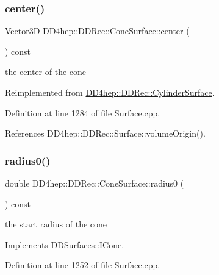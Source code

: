 \subsubsection{\texorpdfstring{center()}{center()}}
{\footnotesize\ttfamily \hyperlink{class_d_d_surfaces_1_1_vector3_d}{Vector3D} D\+D4hep\+::\+D\+D\+Rec\+::\+Cone\+Surface\+::center (\begin{DoxyParamCaption}{ }\end{DoxyParamCaption}) const\hspace{0.3cm}{\ttfamily [virtual]}}



the center of the cone 



Reimplemented from \hyperlink{class_d_d4hep_1_1_d_d_rec_1_1_cylinder_surface_a8043392b62836fcf8f4f0eca596721c9}{D\+D4hep\+::\+D\+D\+Rec\+::\+Cylinder\+Surface}.



Definition at line 1284 of file Surface.\+cpp.



References D\+D4hep\+::\+D\+D\+Rec\+::\+Surface\+::volume\+Origin().

\hypertarget{class_d_d4hep_1_1_d_d_rec_1_1_cone_surface_a9115c03c32a393430c0c92bb98c7a715}{}\label{class_d_d4hep_1_1_d_d_rec_1_1_cone_surface_a9115c03c32a393430c0c92bb98c7a715} 
\subsubsection{\texorpdfstring{radius0()}{radius0()}}
{\footnotesize\ttfamily double D\+D4hep\+::\+D\+D\+Rec\+::\+Cone\+Surface\+::radius0 (\begin{DoxyParamCaption}{ }\end{DoxyParamCaption}) const\hspace{0.3cm}{\ttfamily [virtual]}}



the start radius of the cone 



Implements \hyperlink{class_d_d_surfaces_1_1_i_cone_af7be60438f58e45d5e82a2d826a0a7d7}{D\+D\+Surfaces\+::\+I\+Cone}.



Definition at line 1252 of file Surface.\+cpp.



